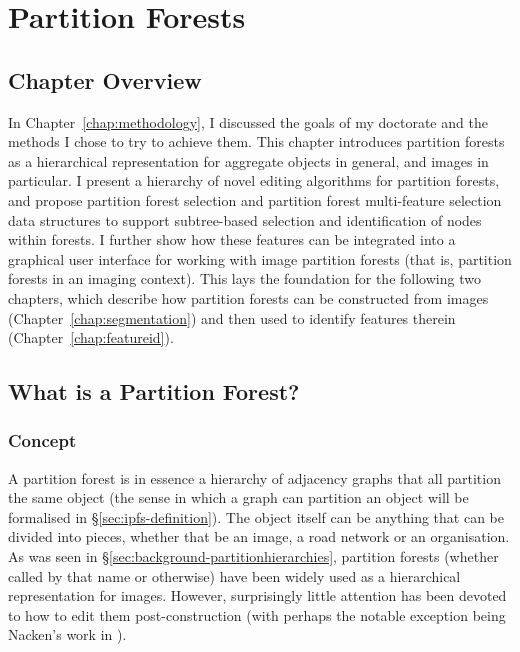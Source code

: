 \chapter{Partition Forests}
\label{chap:ipfs}

\section{Chapter Overview}

In Chapter~\ref{chap:methodology}, I discussed the goals of my doctorate and the methods I chose to try to achieve them. This chapter introduces partition forests as a hierarchical representation for aggregate objects in general, and images in particular. I present a hierarchy of novel editing algorithms for partition forests, and propose partition forest selection and partition forest multi-feature selection data structures to support subtree-based selection and identification of nodes within forests. I further show how these features can be integrated into a graphical user interface for working with image partition forests (that is, partition forests in an imaging context). This lays the foundation for the following two chapters, which describe how partition forests can be constructed from images (Chapter~\ref{chap:segmentation}) and then used to identify features therein (Chapter~\ref{chap:featureid}).

\section{What is a Partition Forest?}

\subsection{Concept}

A partition forest is in essence a hierarchy of adjacency graphs that all partition the same object (the sense in which a graph can partition an object will be formalised in \S\ref{sec:ipfs-definition}). The object itself can be anything that can be divided into pieces, whether that be an image, a road network or an organisation. As was seen in \S\ref{sec:background-partitionhierarchies}, partition forests (whether called by that name or otherwise) have been widely used as a hierarchical representation for images. However, surprisingly little attention has been devoted to how to edit them post-construction (with perhaps the notable exception being Nacken's work in \cite{nacken95}).


